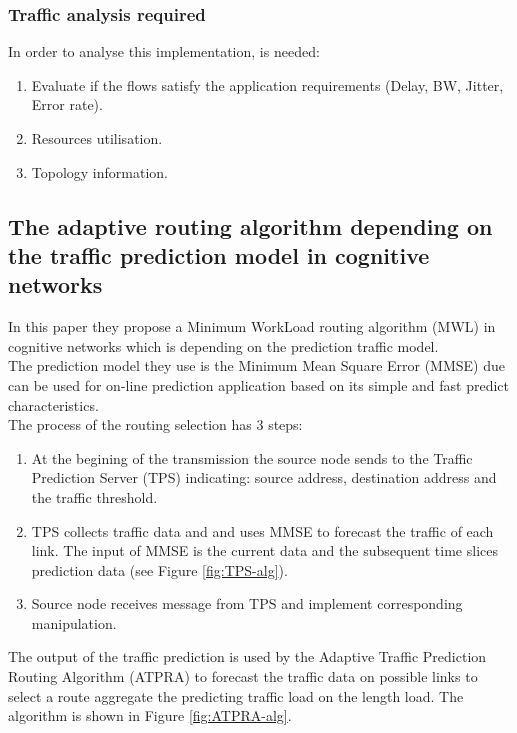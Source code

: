 \subsubsection{Traffic analysis required}

In order to analyse this implementation, is needed:
\begin{enumerate}
\item Evaluate if the flows satisfy the application requirements (Delay, BW, Jitter, Error rate).
\item Resources utilisation.
\item Topology information.  
\end{enumerate}


\subsection{The adaptive routing algorithm depending on the traffic prediction model in cognitive networks}
\label{sec:ATPRA}

In this paper\cite{ATPRA} they propose a Minimum WorkLoad routing algorithm (MWL) in cognitive networks which is depending on the prediction traffic model.\\

The prediction model they use is the Minimum Mean Square Error (MMSE) due can be used for on-line prediction application based on its simple and fast predict characteristics. \\

The process of the routing selection has 3 steps:
\begin{enumerate}
\item At the begining of the transmission the source node sends to the Traffic Prediction Server (TPS) indicating: source address, destination address and the traffic threshold.
\item TPS collects traffic data and and uses MMSE to forecast the traffic of each link. The input of MMSE is the current data and the subsequent time slices prediction data (see Figure \ref{fig:TPS-alg}).
\item Source node receives message from TPS and implement corresponding manipulation.
\end{enumerate}


The output of the traffic prediction is used by the Adaptive Traffic Prediction Routing Algorithm (ATPRA) to forecast the traffic data on possible links to select a route aggregate the predicting traffic load on the length load. The algorithm is shown in Figure \ref{fig:ATPRA-alg}.\\  

